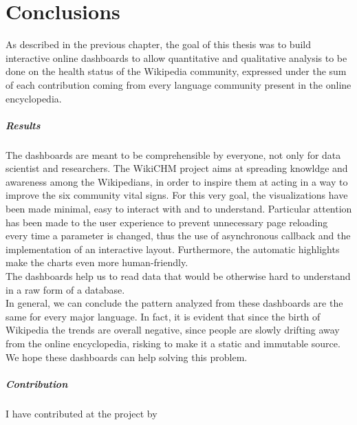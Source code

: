 \chapter{Conclusions}
\label{cha:conclusions}

As described in the previous chapter, the goal of this thesis was to build interactive online dashboards to allow quantitative and qualitative analysis to be done on the health status of the Wikipedia community, expressed under the sum of each contribution coming from every language community present in the online encyclopedia.
\pagebreak
\paragraph{Results}

The dashboards are meant to be comprehensible by everyone, not only for data scientist and researchers. The WikiCHM project aims at spreading knowldge and awareness among the Wikipedians, in order to inspire them at acting in a way to improve the six community vital signs. For this very goal, the visualizations have been made minimal, easy to interact with and to understand. Particular attention has been made to the user experience to prevent unnecessary page reloading every time a parameter is changed, thus the use of asynchronous callback and the implementation of an interactive layout. Furthermore, the automatic highlights make the charts even more human-friendly.\\
The dashboards help us to read data that would be otherwise hard to understand in a raw form of a database. \\
In general, we can conclude the pattern analyzed from these dashboards are the same for every major language. In fact, it is evident that since the birth of Wikipedia the trends are overall negative, since people are slowly drifting away from the online encyclopedia, risking to make it a static and immutable source. \\
We hope these dashboards can help solving this problem.

\paragraph{Contribution}

I have contributed at the project by

